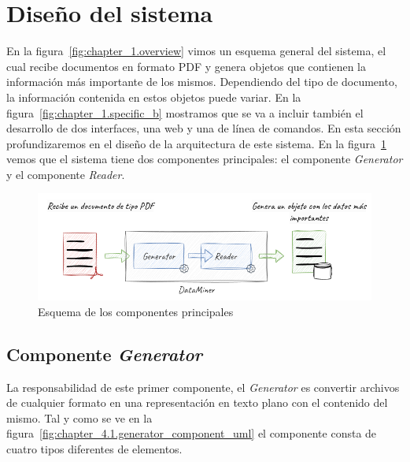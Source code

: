 \section{Diseño del sistema}\label{sec:diseno_del_sistema}

En la figura~\ref{fig:chapter_1.overview} vimos un esquema general del sistema, el cual recibe documentos en formato
PDF y genera objetos que contienen la información más importante de los mismos.
Dependiendo del tipo de documento, la información contenida en estos objetos puede variar.
En la figura~\ref{fig:chapter_1.specific_b} mostramos que se va a incluir también el desarrollo de dos interfaces, una
web y una de línea de comandos.
En esta sección profundizaremos en el diseño de la arquitectura de este sistema.
En la figura~\ref{fig:chapter_4.1.overview} vemos que el sistema tiene dos componentes principales: el componente
\textit{Generator} y el componente \textit{Reader}.

\begin{figure}[ht]
    \begin{center}
        \includegraphics[width=\textwidth]{./chapter/4/images/chapter_4.1.overview}
        \caption{Esquema de los componentes principales}
        \label{fig:chapter_4.1.overview}
    \end{center}
\end{figure}

\subsection{Componente \textit{Generator}}\label{subsec:chapter_4.generator_component}

La responsabilidad de este primer componente, el \textit{Generator} es convertir archivos de cualquier formato en una
representación en texto plano con el contenido del mismo.
Tal y como se ve en la figura~\ref{fig:chapter_4.1.generator_component_uml} el componente consta de cuatro tipos
diferentes de elementos.

